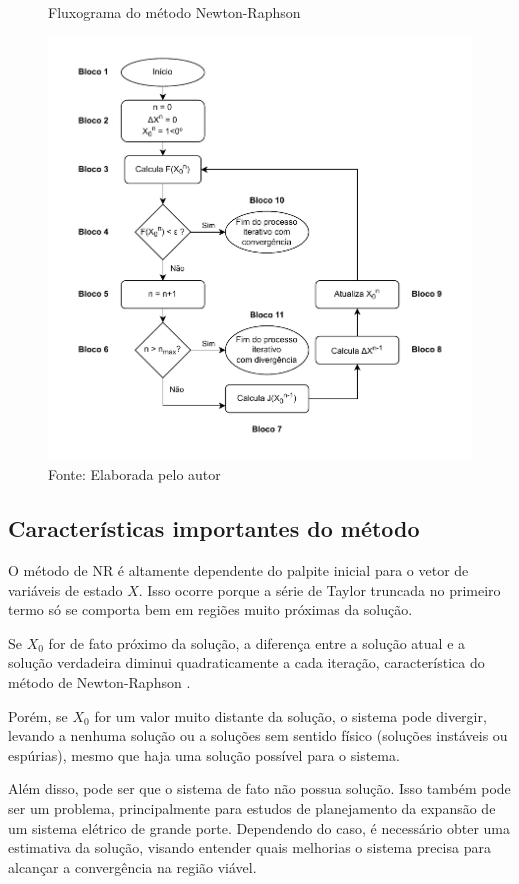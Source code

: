 \begin{figure} [H]
    \centering
    \caption{Fluxograma do método Newton-Raphson}
    \includegraphics{textuais/capitulo2/figuras/Diagrama_NR_4.drawio.pdf}
    \caption*{Fonte: Elaborada pelo autor}
    \label{fig:diagrama_NR}
\end{figure}


\subsection{Características importantes do método}
O método de NR é altamente dependente do palpite inicial para o vetor de variáveis de estado $X$. Isso ocorre porque a série de Taylor truncada no primeiro termo só se comporta bem em regiões muito próximas da solução. 

Se 
$X_0$
for de fato próximo da solução, a diferença entre a solução atual e a solução verdadeira diminui quadraticamente a cada iteração, característica do método de Newton-Raphson \cite{NewtonRaphson}.

Porém, se 
$X_0$
for um valor muito distante da solução, o sistema pode divergir, levando a nenhuma solução ou a soluções sem sentido físico (soluções instáveis ou espúrias), mesmo que haja uma solução possível para o sistema.

Além disso, pode ser que o sistema de fato não possua solução. Isso também pode ser um problema, principalmente para estudos de planejamento da expansão de um sistema elétrico de grande porte.
Dependendo do caso, é necessário obter uma estimativa da solução, visando entender quais melhorias o sistema precisa para alcançar a convergência na região viável.

